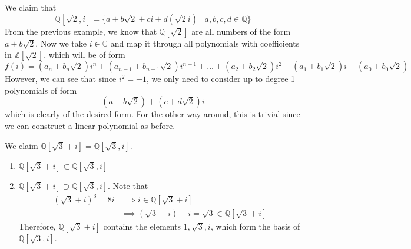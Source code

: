   \begin{example}
    We claim that 
    \begin{equation}
      \mathbb{Q}[\sqrt{2}, i] = \{ a + b \sqrt{2} + ci + d(\sqrt{2} i) \mid a, b, c, d \in \mathbb{Q}\}
    \end{equation}
    From the previous example, we know that $\mathbb{Q}[\sqrt{2}]$ are all numbers of the form $a + b\sqrt{2}$. Now we take $i \in \mathbb{C}$ and map it through all polynomials with coefficients in $\mathbb{Z}[\sqrt{2}]$, which will be of form 
    \begin{equation}
      f(i) = (a_n + b_n \sqrt{2}) i^n + (a_{n-1} + b_{n-1}\sqrt{2}) i^{n-1} + \ldots + (a_2 + b_2 \sqrt{2}) i^2 + (a_1 + b_1 \sqrt{2}) i + (a_0 + b_0 \sqrt{2})
    \end{equation} 
    However, we can see that since $i^2 = -1$, we only need to consider up to degree 1 polynomials of form 
    \begin{equation}
      (a + b \sqrt{2}) + (c + d \sqrt{2}) i 
    \end{equation}
    which is clearly of the desired form. For the other way around, this is trivial since we can construct a linear polynomial as before. 
  \end{example} 

  \begin{example}
    We claim $\mathbb{Q}[\sqrt{3} + i] = \mathbb{Q}[\sqrt{3}, i]$. 
    \begin{enumerate}
      \item $\mathbb{Q}[\sqrt{3} + i] \subset \mathbb{Q}[\sqrt{3}, i]$
      \item $\mathbb{Q}[\sqrt{3} + i] \supset \mathbb{Q}[\sqrt{3}, i]$. Note that 
        \begin{align}
          (\sqrt{3} + i)^3 = 8i & \implies i \in \mathbb{Q}[\sqrt{3} + i] \\
                                & \implies (\sqrt{3} + i) - i = \sqrt{3} \in \mathbb{Q}[\sqrt{3} + i] 
        \end{align}
        Therefore, $\mathbb{Q}[\sqrt{3} + i]$ contains the elements $1, \sqrt{3}, i$, which form the basis of $\mathbb{Q}[\sqrt{3}, i]$. 
    \end{enumerate}
  \end{example}

